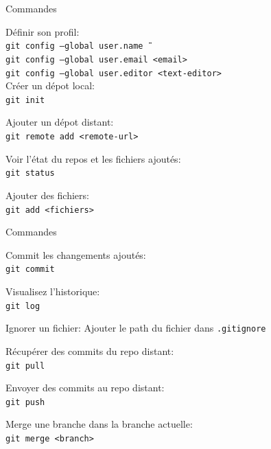 \documentclass{beamer}
\begin{document}
\begin{frame}{Commandes}
    \begin{flushleft}
    Définir son profil: \\
    \texttt{git config --global user.name \"<nom-complet>\"} \\
    \texttt{git config --global user.email <email>} \\
    \texttt{git config --global user.editor <text-editor>} \\

    Créer un dépot local: \\
    \texttt{git init}

    Ajouter un dépot distant: \\
    \texttt{git remote add <remote-url>}

    Voir l'état du repos et les fichiers ajoutés: \\
    \texttt{git status}

    Ajouter des fichiers: \\
    \texttt{git add <fichiers>}
    \end{flushleft}
\end{frame}
\begin{frame}{Commandes}
    \begin{flushleft}
        Commit les changements ajoutés: \\
        \texttt{git commit}

        Visualisez l'historique: \\
        \texttt{git log}

        Ignorer un fichier: Ajouter le path du fichier dans \texttt{.gitignore}

        Récupérer des commits du repo distant: \\
        \texttt{git pull}

        Envoyer des commits au repo distant: \\
        \texttt{git push}

        Merge une branche dans la branche actuelle: \\
        \texttt{git merge <branch>}
    \end{flushleft}
\end{frame}
\end{document}
